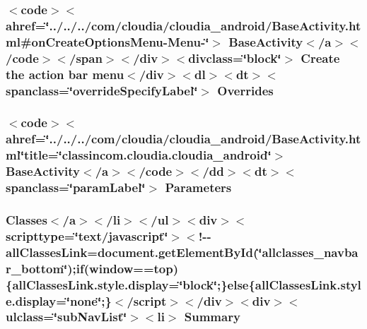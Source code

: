 \hypertarget{_sensor_activity_8html_aed76f90ed460c58c4a3ab820f77c466f}{
\subsubsection[{Overrides}]{\setlength{\rightskip}{0pt plus 5cm}$<$code$>$$<$ahref=\char`\"{}../../../com/cloudia/cloudia\-\_\-android/Base\-Activity.\-html\#{\bf on\-Create\-Options\-Menu}-\/Menu-\/\char`\"{}$>$ Base\-Activity$<$/{\bf a}$>$$<$/code$>$$<$/{\bf span}$>$$<$/div$>$$<$divclass=\char`\"{}block\char`\"{}$>$ Create the action bar {\bf menu}$<$/div$>$$<$dl$>$$<${\bf dt}$>$$<$spanclass=\char`\"{}override\-Specify\-Label\char`\"{}$>$ Overrides}}\label{_sensor_activity_8html_aed76f90ed460c58c4a3ab820f77c466f}
\hypertarget{_sensor_activity_8html_a4eb7712dd2f8cbf746bedba580f47f4d}{
\subsubsection[{Parameters}]{\setlength{\rightskip}{0pt plus 5cm}$<$code$>$$<$ahref=\char`\"{}../../../com/cloudia/cloudia\-\_\-android/Base\-Activity.\-html\char`\"{}title=\char`\"{}classincom.\-cloudia.\-cloudia\-\_\-android\char`\"{}$>$ Base\-Activity$<$/{\bf a}$>$$<$/code$>$$<$/{\bf dd}$>$$<${\bf dt}$>$$<$spanclass=\char`\"{}param\-Label\char`\"{}$>$ Parameters}}\label{_sensor_activity_8html_a4eb7712dd2f8cbf746bedba580f47f4d}
\hypertarget{_sensor_activity_8html_a6f9ab45abc9b0679dc1b132fbacfc681}{
\subsubsection[{Summary}]{\setlength{\rightskip}{0pt plus 5cm}Classes$<$/{\bf a}$>$$<$/li$>$$<$/ul$>$$<$div$>$$<$scripttype=\char`\"{}text/javascript\char`\"{}$>$$<$!-\/-\/all\-Classes\-Link=document.\-get\-Element\-By\-Id(\char`\"{}allclasses\-\_\-navbar\-\_\-bottom\char`\"{});if(window==top)\{all\-Classes\-Link.\-style.\-display=\char`\"{}block\char`\"{};\}else\{all\-Classes\-Link.\-style.\-display=\char`\"{}none\char`\"{};\}$<$/script$>$$<$/div$>$$<$div$>$$<$ulclass=\char`\"{}sub\-Nav\-List\char`\"{}$>$$<$li$>$ Summary}}\label{_sensor_activity_8html_a6f9ab45abc9b0679dc1b132fbacfc681}
